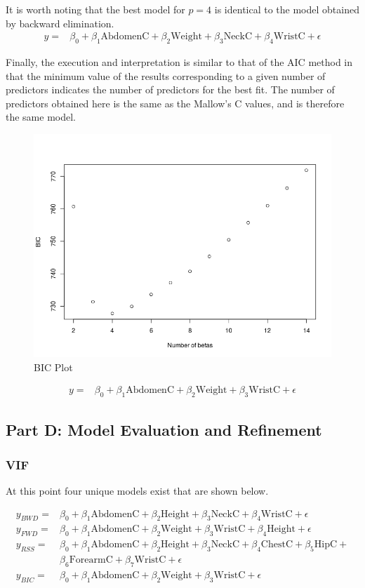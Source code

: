 \documentclass[a4paper, 11pt]{article}
\begin{document}
It is worth noting that the best model for $p=4$ is identical to the model obtained by backward elimination.
\begin{align*}
	y = & \beta_0 + \beta_1\text{AbdomenC} + \beta_2\text{Weight} + \beta_3\text{NeckC} + \beta_4\text{WristC} + \epsilon
\end{align*}

Finally, the execution and interpretation is similar to that of the AIC method in that the minimum value of the results corresponding to a given number of predictors indicates the number of predictors for the best fit. The number of predictors obtained here is the same as the Mallow's C values, and is therefore the same model.
\begin{figure}[H]
	\centering
	\caption{BIC Plot}
	\centerline{\includegraphics[width=.8\textwidth]{bic.png}}
\end{figure}

\begin{align*}
	y = & \beta_0 + \beta_1\text{AbdomenC} + \beta_2\text{Weight} + \beta_3\text{WristC} + \epsilon
\end{align*}

\subsection*{Part D: Model Evaluation and Refinement}
\subsubsection*{VIF}
At this point four unique models exist that are shown below.

\begin{align*}
	y_{BWD} = & \beta_0 + \beta_1\text{AbdomenC} + \beta_2\text{Height} + \beta_3\text{NeckC} + \beta_4\text{WristC} + \epsilon \\
	y_{FWD} = & \beta_0 + \beta_1\text{AbdomenC} + \beta_2\text{Weight} + \beta_3\text{WristC} + \beta_4\text{Height} + \epsilon \\
	y_{RSS} = & \beta_0 + \beta_1\text{AbdomenC} + \beta_2\text{Height} + \beta_3\text{NeckC} + \beta_4\text{ChestC} + \beta_5\text{HipC} + \\
	&\beta_6\text{ForearmC} + \beta_7\text{WristC} + \epsilon \\
	y_{BIC} = & \beta_0 + \beta_1\text{AbdomenC} + \beta_2\text{Weight} + \beta_3\text{WristC} + \epsilon
\end{align*}
\end{document}
